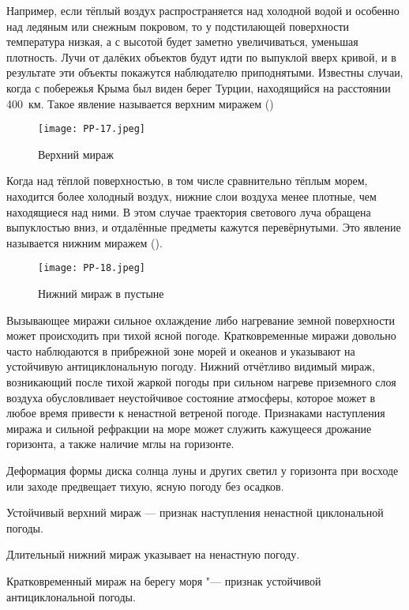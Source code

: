 Например, если тёплый воздух распространяется над холодной водой и
особенно над ледяным или снежным покровом, то у подстилающей
поверхности температура низкая, а с высотой будет заметно
увеличиваться, уменьшая плотность. Лучи от далёких объектов будут идти
по выпуклой вверх кривой, и в результате эти объекты покажутся
наблюдателю приподнятыми. Известны случаи, когда с побережья Крыма был
виден берег Турции, находящийся на расстоянии 400~км. Такое явление
называется верхним миражем ()

\begin{figure}[htb]
  \centering{}
  \texttt{[image: PP-17.jpeg]}
  \caption{Верхний мираж}
  \label{fig:pp17}
  \small
  \centering{}
\end{figure}

Когда над тёплой поверхностью, в том числе сравнительно тёплым морем,
находится более холодный воздух, нижние слои воздуха менее плотные,
чем находящиеся над ними. В этом случае траектория светового луча
обращена выпуклостью вниз, и отдалённые предметы кажутся
перевёрнутыми. Это явление называется нижним миражем ().

\begin{figure}[htb]
  \centering{}
  \texttt{[image: PP-18.jpeg]}
  \caption{Нижний мираж в пустыне}
  \label{fig:pp18}
  \small
  \centering{}
\end{figure}

Вызывающее миражи сильное охлаждение либо нагревание земной
поверхности может происходить при тихой ясной погоде. Кратковременные
миражи довольно часто наблюдаются в прибрежной зоне морей и океанов и
указывают на устойчивую антициклональную погоду. Нижний отчётливо
видимый мираж, возникающий после тихой жаркой погоды при сильном
нагреве приземного слоя воздуха обусловливает неустойчивое состояние
атмосферы, которое может в любое время привести к ненастной ветреной
погоде. Признаками наступления миража и сильной рефракции на море
может служить кажущееся дрожание горизонта, а также наличие мглы на
горизонте.

 Деформация формы диска солнца луны и других светил у горизонта
при восходе или заходе предвещает тихую, ясную погоду без осадков.

 Устойчивый верхний мираж — признак наступления ненастной
циклональной погоды.

 Длительный нижний мираж указывает на ненастную погоду.

 Кратковременный мираж на берегу моря "--- признак устойчивой
антициклональной погоды.

